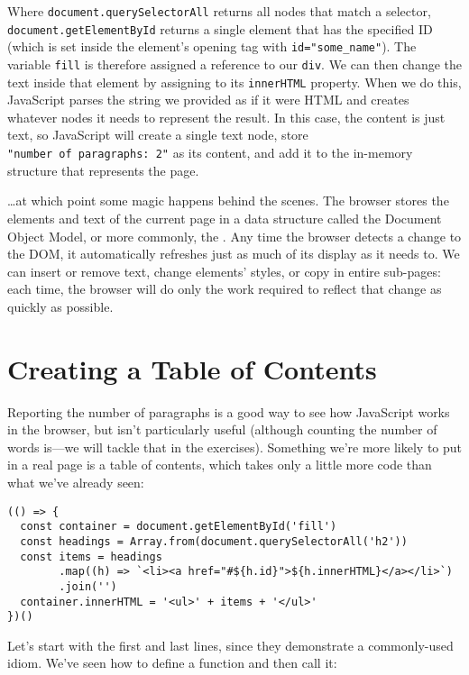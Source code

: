 Where \texttt{document.querySelectorAll} returns all nodes that match a selector,
\texttt{document.getElementById} returns a single element that has the specified ID
(which is set inside the element's opening tag with \texttt{id="some\_name"}).
The variable \texttt{fill} is therefore assigned a reference to our \texttt{div}.
We can then change the text inside that element by assigning to its \texttt{innerHTML} property.
When we do this,
JavaScript parses the string we provided as if it were HTML
and creates whatever nodes it needs to represent the result.
In this case,
the content is just text,
so JavaScript will create a single text node,
store \texttt{"number\ of\ paragraphs:\ 2"} as its content,
and add it to the in-memory structure that represents the page.

\ldots{}at which point some magic happens behind the scenes.
The browser stores the elements and text of the current page in a data structure called
the Document Object Model,
or more commonly, the .
Any time the browser detects a change to the DOM,
it automatically refreshes just as much of its display as it needs to.
We can insert or remove text,
change elements' styles,
or copy in entire sub-pages:
each time,
the browser will do only the work required to reflect that change
as quickly as possible.

\section{Creating a Table of Contents}\label{s:pages-toc}

Reporting the number of paragraphs is a good way to see how JavaScript works in the browser,
but isn't particularly useful
(although counting the number of words is---we will tackle that in the exercises).
Something we're more likely to put in a real page is a table of contents,
which takes only a little more code than what we've already seen:

\begin{verbatim}
(() => {
  const container = document.getElementById('fill')
  const headings = Array.from(document.querySelectorAll('h2'))
  const items = headings
        .map((h) => `<li><a href="#${h.id}">${h.innerHTML}</a></li>`)
        .join('')
  container.innerHTML = '<ul>' + items + '</ul>'
})()
\end{verbatim}

Let's start with the first and last lines,
since they demonstrate a commonly-used idiom.
We've seen how to define a function and then call it:

